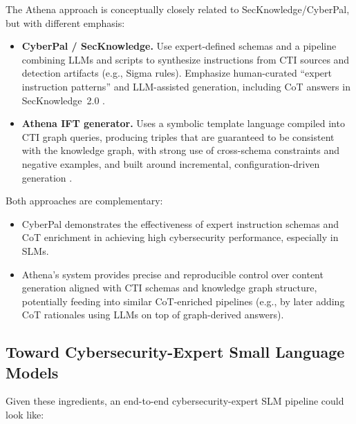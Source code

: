 \documentclass[unnumsec,webpdf,contemporary,large]{oup-authoring-template}
\theoremstyle{thmstyleone}
\theoremstyle{thmstyletwo}
\theoremstyle{thmstylethree}
\begin{document}
The Athena approach is conceptually closely related to SecKnowledge/CyberPal, but with different emphasis:

\begin{itemize}
  \item \textbf{CyberPal / SecKnowledge.} Use expert-defined schemas and a pipeline combining LLMs and scripts to synthesize instructions from CTI sources and detection artifacts (e.g., Sigma rules). Emphasize human-curated ``expert instruction patterns'' and LLM-assisted generation, including CoT answers in SecKnowledge~2.0 \cite{levi2024cyberpal,levi2025toward}.
  \item \textbf{Athena IFT generator.} Uses a symbolic template language compiled into CTI graph queries, producing triples that are guaranteed to be consistent with the knowledge graph, with strong use of cross-schema constraints and negative examples, and built around incremental, configuration-driven generation \cite{cardei2025ift}.
\end{itemize}

Both approaches are complementary:

\begin{itemize}
  \item CyberPal demonstrates the effectiveness of expert instruction schemas and CoT enrichment in achieving high cybersecurity performance, especially in SLMs.
  \item Athena's system provides precise and reproducible control over content generation aligned with CTI schemas and knowledge graph structure, potentially feeding into similar CoT-enriched pipelines (e.g., by later adding CoT rationales using LLMs on top of graph-derived answers).
\end{itemize}

\subsection{Toward Cybersecurity-Expert Small Language Models}

Given these ingredients, an end-to-end cybersecurity-expert SLM pipeline could look like:
\end{document}
